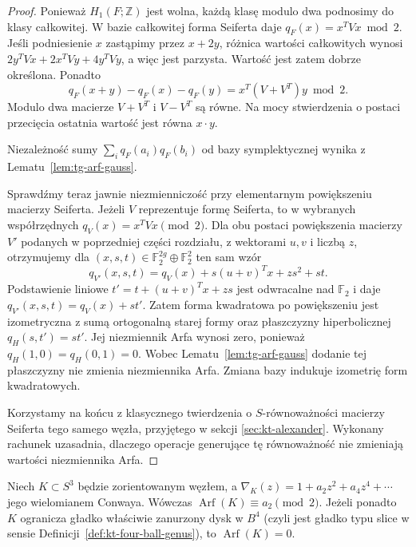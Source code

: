 \begin{proof}
Ponieważ $H_1(F;\mathbb Z)$ jest wolna, każdą klasę
modulo dwa podnosimy do klasy całkowitej. W bazie
całkowitej forma Seiferta daje $q_F(x)=x^TVx\bmod 2$.
Jeśli podniesienie $x$ zastąpimy przez $x+2y$,
różnica wartości całkowitych wynosi
$2y^TVx+2x^TVy+4y^TVy$, a więc jest parzysta.
Wartość jest zatem dobrze określona. Ponadto
\[
q_F(x+y)-q_F(x)-q_F(y)
=x^T(V+V^T)y\bmod 2.
\]
Modulo dwa macierze $V+V^T$ i $V-V^T$ są równe.
Na mocy stwierdzenia o postaci przecięcia ostatnia
wartość jest równa $x\cdot y$.

Niezależność sumy $\sum_iq_F(a_i)q_F(b_i)$ od bazy
symplektycznej wynika z Lematu~\ref{lem:tg-arf-gauss}.

Sprawdźmy teraz jawnie niezmienniczość przy elementarnym
powiększeniu macierzy Seiferta. Jeżeli $V$ reprezentuje
formę Seiferta, to w wybranych współrzędnych
$q_V(x)=x^TVx\pmod2$. Dla obu postaci powiększenia
macierzy $V'$ podanych w poprzedniej części rozdziału,
z wektorami $u,v$ i liczbą $z$, otrzymujemy
dla $(x,s,t)\in\mathbb F_2^{2g}\oplus\mathbb F_2^2$
ten sam wzór
\[
q_{V'}(x,s,t)
=q_V(x)+s(u+v)^Tx+zs^2+st.
\]
Podstawienie liniowe
$t'=t+(u+v)^Tx+zs$
jest odwracalne nad $\mathbb F_2$ i daje
$q_{V'}(x,s,t)=q_V(x)+st'$.
Zatem forma kwadratowa po powiększeniu
jest izometryczna z sumą ortogonalną starej
formy oraz płaszczyzny hiperbolicznej
$q_H(s,t')=st'$. Jej niezmiennik Arfa wynosi
zero, ponieważ $q_H(1,0)=q_H(0,1)=0$.
Wobec Lematu~\ref{lem:tg-arf-gauss} dodanie tej
płaszczyzny nie zmienia niezmiennika Arfa.
Zmiana bazy indukuje izometrię form kwadratowych.

Korzystamy na końcu z klasycznego twierdzenia
o $S$-równoważności macierzy Seiferta tego samego
węzła, przyjętego w sekcji \ref{sec:kt-alexander}. Wykonany rachunek uzasadnia, dlaczego
operacje generujące tę równoważność nie zmieniają
wartości niezmiennika Arfa.
\end{proof}

\begin{twierdzenie}
\label{thm:kt-arf-conway-slice}
Niech $K\subset S^3$ będzie zorientowanym węzłem,
a $\nabla_K(z)=1+a_2z^2+a_4z^4+\cdots$
jego wielomianem Conwaya. Wówczas
$\operatorname{Arf}(K)\equiv a_2\pmod2$.
Jeżeli ponadto $K$ ogranicza gładko właściwie
zanurzony dysk w $B^4$ (czyli jest gładko typu slice
w sensie Definicji~\ref{def:kt-four-ball-genus}),
to $\operatorname{Arf}(K)=0$.
\end{twierdzenie}

